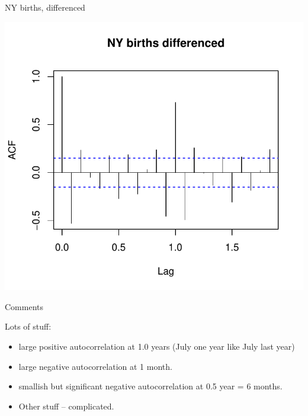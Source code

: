 \begin{frame}[fragile]{NY births, differenced}
  
\begin{knitrout}
\color{fgcolor}\begin{kframe}
\begin{alltt}
\hlstd{=}\hlstd{)}
\end{alltt}
\end{kframe}
\includegraphics[width=\maxwidth]{figure/cesena-1} 

\end{knitrout}
  
\end{frame}

\begin{frame}[fragile]{Comments}

  Lots of stuff:

  \begin{itemize}
\item large positive autocorrelation at 1.0 years (July one year like July last year)
\item large negative autocorrelation at 1 month.
\item smallish but significant negative autocorrelation at 0.5 year = 6 months.
\item Other stuff -- complicated.

  \end{itemize}
  
\end{frame}

